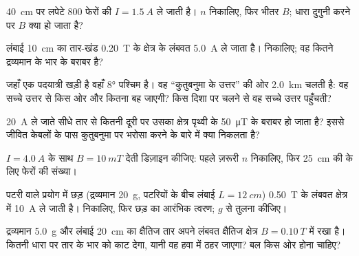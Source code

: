 \begin{exercise}[$\star$]\label{exo:g11:magnetic-fields:4}
\qty{40}{cm} पर लपेटे $800$ फेरों की  $I = \qty{1.5}{A}$ ले जाती है।
$n$ निकालिए, फिर भीतर $B$; धारा दुगुनी करने पर $B$ क्या हो जाता
है?
\end{exercise}

\begin{exercise}[$\star$]\label{exo:g11:magnetic-fields:5}
लंबाई \qty{10}{cm} का तार-खंड \qty{0.20}{T} के क्षेत्र के लंबवत \qty{5.0}{A} ले
जाता है।  निकालिए; वह कितने द्रव्यमान के भार के
बराबर है?
\end{exercise}

\begin{exercise}[$\star\star$]\label{exo:g11:magnetic-fields:6}
जहाँ एक पदयात्री खड़ी है वहाँ  $\ang{8}$ पश्चिम है। वह
``कुतुबनुमा के उत्तर'' की ओर \qty{2.0}{km} चलती है: वह सच्चे उत्तर से किस ओर और
कितना बह जाएगी? किस दिशा पर चलने से वह सच्चे उत्तर पहुँचती?
\end{exercise}

\begin{exercise}[$\star\star$]\label{exo:g11:magnetic-fields:7}
\qty{20}{A} ले जाते सीधे तार से कितनी दूरी पर उसका क्षेत्र पृथ्वी के
\qty{50}{\micro T} के बराबर हो जाता है? इससे जीवित केबलों के पास कुतुबनुमा पर भरोसा
करने के बारे में क्या निकलता है?
\end{exercise}

\begin{exercise}[$\star\star$]\label{exo:g11:magnetic-fields:8}
$I = \qty{4.0}{A}$ के साथ $B = \qty{10}{mT}$ देती  डिज़ाइन कीजिए: पहले ज़रूरी
$n$ निकालिए, फिर \qty{25}{cm} की  के लिए फेरों की संख्या।
\end{exercise}

\begin{exercise}[$\star\star$]\label{exo:g11:magnetic-fields:9}
पटरी वाले प्रयोग में छड़ (द्रव्यमान \qty{20}{g}, पटरियों के बीच लंबाई $L = \qty{12}{cm}$)
\qty{0.50}{T} के लंबवत क्षेत्र में \qty{10}{A} ले जाती है।
 निकालिए, फिर छड़ का आरंभिक त्वरण; $g$ से तुलना कीजिए।
\end{exercise}

\begin{exercise}[$\star\star$]\label{exo:g11:magnetic-fields:10}
द्रव्यमान \qty{5.0}{g} और लंबाई \qty{20}{cm} का क्षैतिज तार अपने लंबवत क्षैतिज
क्षेत्र $B = \qty{0.10}{T}$ में रखा है। कितनी धारा पर  तार
के भार को काट देगा, यानी वह हवा में ठहर जाएगा? बल किस ओर
होना चाहिए?
\end{exercise}

